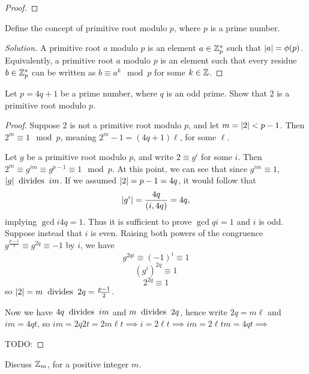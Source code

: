 \documentclass[11pt]{article}
\begin{document}
\begin{proof}

\end{proof}

\begin{exercise}{8}
Define the concept of primitive root modulo $ p $, where $ p $ is a prime number.
\end{exercise}

\begin{proof}[Solution]
A primitive root $ a $ modulo $ p $ is an element $ a \in \mathbb{Z}_{p}^{*} $ such that $ |a| = \phi(p) $. Equivalently, a primitive root $ a $ modulo $ p $ is an element such that every residue $ b \in \mathbb{Z}_{p}^{*} $ can be written as $ b \equiv a^{k} \mod p$ for some $ k \in \mathbb{Z} $.
\end{proof}

\begin{exercise}{9}
Let $ p = 4q + 1$ be a prime number, where $ q $ is an odd prime. Show that $ 2 $ is a primitive root modulo $ p $.
\end{exercise}

\begin{proof}
Suppose $ 2 $ is not a primitive root modulo $ p $, and let $ m = |2| < p - 1 $. Then $ 2^{m} \equiv 1 \mod p $, meaning $ 2^{m} - 1 = (4q + 1) \ell $, for some $ \ell $. 

Let $ g $ be a primitive root modulo $ p $, and write $ 2 \equiv g^{i} $ for some $ i $. Then $ 2^{m} \equiv g^{im} \equiv g^{p-1} \equiv 1 \mod p $. At this point, we can see that since $ g^{im} \equiv 1 $, $ |g| \mathbin{\text{\ divides\ }} im $. If we assumed $ |2| = p-1 = 4q $, it would follow that
\[ |g^{i}| = \frac{4q}{(i, 4q)} = 4q,\]
implying $ \gcd{i}{4q}  = 1$. Thus it is sufficient to prove $ \gcd{q}{i} = 1 $ and $ i $ is odd. Suppose instead that $ i$ is even. Raising both powers of the congruence $ g^{\frac{p-1}{2}} \equiv g^{2q} \equiv -1 $ by $ i $, we have
\[ g^{2qi} \equiv (-1)^{i} \equiv 1 \]
\[ (g^{i})^{2q} \equiv 1 \]
\[ 2^{2q} \equiv 1 \]
so $ |2| = m \mathbin{\text{\ divides\ }} 2q = \frac{p-1}{2} $.

Now we have $ 4q \mathbin{\text{\ divides\ }} im $ and $ m \mathbin{\text{\ divides\ }} 2q $, hence write $ 2q = m \ell $ and $ im = 4q t $, so $ im = 2q 2t = 2m \ell t \implies i = 2 \ell t \implies im = 2 \ell t m = 4 q t \implies  $



TODO:
\end{proof}

\begin{exercise}{10}
Discuss $ \mathbb{Z}_{m} $, for a positive integer $ m $.
\end{exercise}
\end{document}
